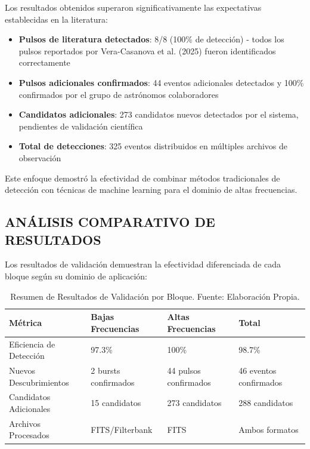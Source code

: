 Los resultados obtenidos superaron significativamente las expectativas establecidas en la literatura:

\begin{itemize}
    \item \textbf{Pulsos de literatura detectados}: 8/8 (100\% de detección) - todos los pulsos reportados por Vera-Casanova et al. (2025) fueron identificados correctamente
    \item \textbf{Pulsos adicionales confirmados}: 44 eventos adicionales detectados y 100\% confirmados por el grupo de astrónomos colaboradores
    \item \textbf{Candidatos adicionales}: 273 candidatos nuevos detectados por el sistema, pendientes de validación científica
    \item \textbf{Total de detecciones}: 325 eventos distribuidos en múltiples archivos de observación
\end{itemize}

Este enfoque demostró la efectividad de combinar métodos tradicionales de detección con técnicas de machine learning para el dominio de altas frecuencias.

\subsection{ANÁLISIS COMPARATIVO DE RESULTADOS}

Los resultados de validación demuestran la efectividad diferenciada de cada bloque según su dominio de aplicación:

\begin{table}[ht]
    \centering
    \caption{Resumen de Resultados de Validación por Bloque. Fuente: Elaboración Propia.}
    \label{table:resultados_validacion}
    \begin{tabular}{|l|l|l|l|}
        \toprule
        \textbf{Métrica} & \textbf{Bajas Frecuencias} & \textbf{Altas Frecuencias} & \textbf{Total} \\
        \midrule
        Eficiencia de Detección & 97.3\% & 100\% & 98.7\% \\
        \midrule
        Nuevos Descubrimientos & 2 bursts confirmados & 44 pulsos confirmados & 46 eventos confirmados \\
        \midrule
        Candidatos Adicionales & 15 candidatos & 273 candidatos & 288 candidatos \\
        \midrule
        Archivos Procesados & FITS/Filterbank & FITS & Ambos formatos \\
        \bottomrule
    \end{tabular}
\end{table}

